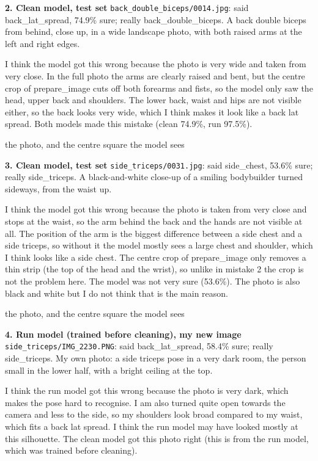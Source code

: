 \documentclass[11pt]{article}
\begin{document}
  {\textbf{2. Clean model, test set} \texttt{back\_double\_biceps/0014.jpg}: said back\_lat\_spread, 74.9\% sure; really back\_double\_biceps. A back double biceps from behind, close up, in a wide landscape photo, with both raised arms at the left and right edges.

  I think the model got this wrong because the photo is very wide and taken from very close. In the full photo the arms are clearly raised and bent, but the centre crop of prepare\_image cuts off both forearms and fists, so the model only saw the head, upper back and shoulders. The lower back, waist and hips are not visible either, so the back looks very wide, which I think makes it look like a back lat spread. Both models made this mistake (clean 74.9\%, run 97.5\%).}

\begin{center}
\par\small
the photo, and the centre square the model sees
\end{center}

  {\textbf{3. Clean model, test set} \texttt{side\_triceps/0031.jpg}: said side\_chest, 53.6\% sure; really side\_triceps. A black-and-white close-up of a smiling bodybuilder turned sideways, from the waist up.

  I think the model got this wrong because the photo is taken from very close and stops at the waist, so the arm behind the back and the hands are not visible at all. The position of the arm is the biggest difference between a side chest and a side triceps, so without it the model mostly sees a large chest and shoulder, which I think looks like a side chest. The centre crop of prepare\_image only removes a thin strip (the top of the head and the wrist), so unlike in mistake 2 the crop is not the problem here. The model was not very sure (53.6\%). The photo is also black and white but I do not think that is the main reason.}

\begin{center}
\par\small
the photo, and the centre square the model sees
\end{center}

  {\textbf{4. Run model (trained before cleaning), my new image} \texttt{side\_triceps/IMG\_2230.PNG}: said back\_lat\_spread, 58.4\% sure; really side\_triceps. My own photo: a side triceps pose in a very dark room, the person small in the lower half, with a bright ceiling at the top.

  I think the run model got this wrong because the photo is very dark, which makes the pose hard to recognise. I am also turned quite open towards the camera and less to the side, so my shoulders look broad compared to my waist, which fits a back lat spread. I think the run model may have looked mostly at this silhouette. The clean model got this photo right (this is from the run model, which was trained before cleaning).}
\end{document}
